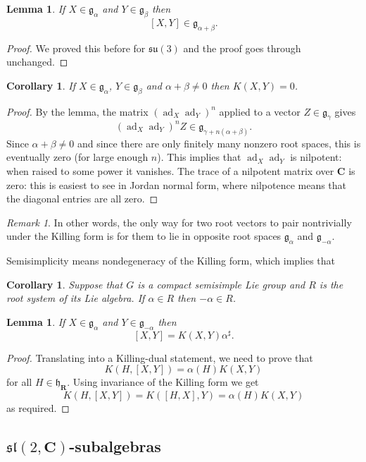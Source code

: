 \documentclass[12pt]{article}
\newcommand{\CC}{\mathbf{C}}
\newcommand{\RR}{\mathbf{R}}
\newcommand{\OP}{\operatorname}
\newcommand{\ad}{\OP{ad}}
\newtheorem{lma}[thm]{Lemma}
\newtheorem{cor}[thm]{Corollary}
\theoremstyle{definition}
\theoremstyle{check}
\theoremstyle{remark}
\newtheorem{rmk}[thm]{Remark}
\theoremstyle{TheoremNum}
\begin{document}
\begin{lma}
If $X\in\mathfrak{g}_{\alpha}$ and $Y\in\mathfrak{g}_{\beta}$ then
\[[X,Y]\in\mathfrak{g}_{\alpha+\beta}.\]
\end{lma}
\begin{proof}
We proved this before for $\mathfrak{su}(3)$ and the proof goes through unchanged.
\end{proof}

\begin{cor}
If $X\in\mathfrak{g}_{\alpha}$, $Y\in\mathfrak{g}_{\beta}$ and $\alpha+\beta\neq 0$ then $K(X,Y)=0$.
\end{cor}
\begin{proof}
By the lemma, the matrix $\left(\ad_X\ad_Y\right)^n$ applied to a vector $Z\in\mathfrak{g}_{\gamma}$ gives
\[\left(\ad_X\ad_Y\right)^nZ\in\mathfrak{g}_{\gamma+n(\alpha+\beta)}.\]
Since $\alpha+\beta\neq 0$ and since there are only finitely many nonzero root spaces, this is eventually zero (for large enough $n$). This implies that $\ad_X\ad_Y$ is nilpotent: when raised to some power it vanishes. The trace of a nilpotent matrix over $\CC$ is zero: this is easiest to see in Jordan normal form, where nilpotence means that the diagonal entries are all zero.
\end{proof}
\begin{rmk}\label{rmk-killing-nondeg}
In other words, the only way for two root vectors to pair nontrivially under the Killing form is for them to lie in opposite root spaces $\mathfrak{g}_{\alpha}$ and $\mathfrak{g}_{-\alpha}$.
\end{rmk}
Semisimplicity means nondegeneracy of the Killing form, which implies that
\begin{cor}
Suppose that $G$ is a compact semisimple Lie group and $R$ is the root system of its Lie algebra. If $\alpha\in R$ then $-\alpha\in R$.
\end{cor}

\begin{lma}\label{lma-killing-sl2}
If $X\in\mathfrak{g}_{\alpha}$ and $Y\in\mathfrak{g}_{-\alpha}$ then
\[[X,Y]=K(X,Y)\alpha^{\sharp}.\]
\end{lma}
\begin{proof}
Translating into a Killing-dual statement, we need to prove that
\[K(H,[X,Y])=\alpha(H)K(X,Y)\]
for all $H\in\mathfrak{h}_{\RR}$. Using invariance of the Killing form we get
\[K(H,[X,Y])=K([H,X],Y)=\alpha(H)K(X,Y)\]
as required.
\end{proof}

\subsection{\texorpdfstring{$\mathfrak{sl}(2,\CC)$}{sl(2,C)}-subalgebras}
\end{document}

